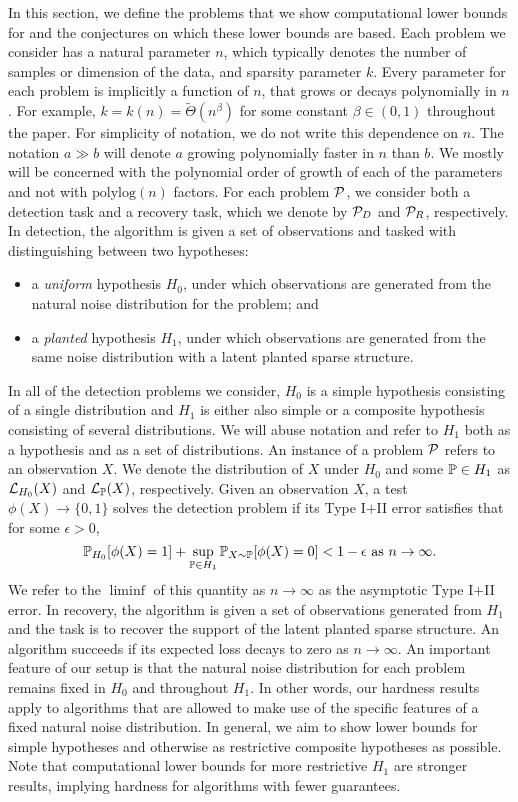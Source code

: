 \documentclass[11pt]{article}
\begin{document}
In this section, we define the problems that we show computational lower bounds for and the conjectures on which these lower bounds are based. Each problem we consider has a natural parameter $n$, which typically denotes the number of samples or dimension of the data, and sparsity parameter $k$. Every parameter for each problem is implicitly a function of $n$, that grows or decays polynomially in $n$. For example, $k = k(n) = \tilde{\Theta}(n^{\beta})$ for some constant $\beta \in (0, 1)$ throughout the paper. For simplicity of notation, we do not write this dependence on $n$. The notation $a \gg b$ will denote $a$ growing polynomially faster in $n$ than $b$. We mostly will be concerned with the polynomial order of growth of each of the parameters and not with $\text{polylog}(n)$ factors. For each problem $\mathcal{P}$, we consider both a detection task and a recovery task, which we denote by $\mathcal{P}_D$ and $\mathcal{P}_R$, respectively. In detection, the algorithm is given a set of observations and tasked with distinguishing between two hypotheses:
\begin{itemize}
\item a \emph{uniform} hypothesis $H_0$, under which observations are generated from the natural noise distribution for the problem; and
\item a \emph{planted} hypothesis $H_1$, under which observations are generated from the same noise distribution with a latent planted sparse structure.
\end{itemize}
In all of the detection problems we consider, $H_0$ is a simple hypothesis consisting of a single distribution and $H_1$ is either also simple or a composite hypothesis consisting of several distributions. We will abuse notation and refer to $H_1$ both as a hypothesis and as a set of distributions. An instance of a problem $\mathcal{P}$ refers to an observation $X$. We denote the distribution of $X$ under $H_0$ and some $\mathbb{P} \in H_1$ as $\mathcal{L}_{H_0}(X)$ and $\mathcal{L}_{\mathbb{P}}(X)$, respectively. Given an observation $X$, a test $\phi(X) \to \{0, 1\}$ solves the detection problem if its Type I$+$II error satisfies that for some $\epsilon > 0$,
$$\mathbb{P}_{H_0}[\phi(X) = 1] + \sup_{\mathbb{P} \in H_1} \mathbb{P}_{X \sim \mathbb{P}}[\phi(X) = 0] < 1 - \epsilon \text{ as } n \to \infty.$$
We refer to the $\liminf$ of this quantity as $n \to \infty$ as the asymptotic Type I$+$II error. In recovery, the algorithm is given a set of observations generated from $H_1$ and the task is to recover the support of the latent planted sparse structure. An algorithm succeeds if its expected loss decays to zero as $n \to \infty$. An important feature of our setup is that the natural noise distribution for each problem remains fixed in $H_0$ and throughout $H_1$. In other words, our hardness results apply to algorithms that are allowed to make use of the specific features of a fixed natural noise distribution. In general, we aim to show lower bounds for simple hypotheses and otherwise as restrictive composite hypotheses as possible. Note that computational lower bounds for more restrictive $H_1$ are stronger results, implying hardness for algorithms with fewer guarantees.
\end{document}
